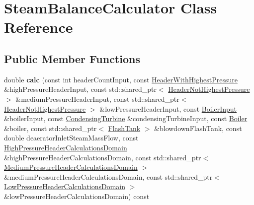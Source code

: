 \hypertarget{class_steam_balance_calculator}{}\section{Steam\+Balance\+Calculator Class Reference}
\label{class_steam_balance_calculator}
\subsection*{Public Member Functions}
\begin{DoxyCompactItemize}
\item 
\mbox{\label{class_steam_balance_calculator_a34acbdf14e3c671b55abfede65ede138}} 
double {\bfseries calc} (const int header\+Count\+Input, const \hyperlink{class_header_with_highest_pressure}{Header\+With\+Highest\+Pressure} \&high\+Pressure\+Header\+Input, const std\+::shared\+\_\+ptr$<$ \hyperlink{class_header_not_highest_pressure}{Header\+Not\+Highest\+Pressure} $>$ \&medium\+Pressure\+Header\+Input, const std\+::shared\+\_\+ptr$<$ \hyperlink{class_header_not_highest_pressure}{Header\+Not\+Highest\+Pressure} $>$ \&low\+Pressure\+Header\+Input, const \hyperlink{class_boiler_input}{Boiler\+Input} \&boiler\+Input, const \hyperlink{class_condensing_turbine}{Condensing\+Turbine} \&condensing\+Turbine\+Input, const \hyperlink{class_boiler}{Boiler} \&boiler, const std\+::shared\+\_\+ptr$<$ \hyperlink{class_flash_tank}{Flash\+Tank} $>$ \&blowdown\+Flash\+Tank, const double deaerator\+Inlet\+Steam\+Mass\+Flow, const \hyperlink{class_high_pressure_header_calculations_domain}{High\+Pressure\+Header\+Calculations\+Domain} \&high\+Pressure\+Header\+Calculations\+Domain, const std\+::shared\+\_\+ptr$<$ \hyperlink{class_medium_pressure_header_calculations_domain}{Medium\+Pressure\+Header\+Calculations\+Domain} $>$ \&medium\+Pressure\+Header\+Calculations\+Domain, const std\+::shared\+\_\+ptr$<$ \hyperlink{class_low_pressure_header_calculations_domain}{Low\+Pressure\+Header\+Calculations\+Domain} $>$ \&low\+Pressure\+Header\+Calculations\+Domain) const
\item 
\mbox{\label{class_steam_balance_calculator_a34acbdf14e3c671b55abfede65ede138}} 

\end{DoxyCompactItemize}
